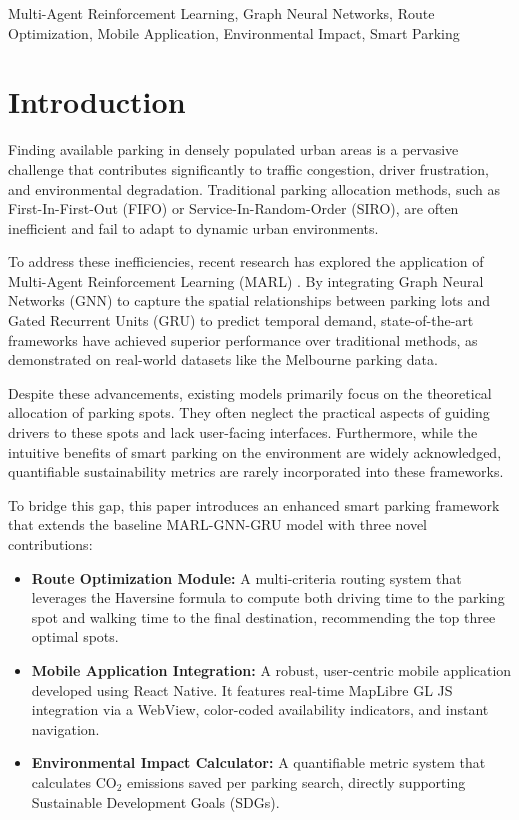 \documentclass[conference]{IEEEtran}
\begin{document}
\begin{IEEEkeywords}
Multi-Agent Reinforcement Learning, Graph Neural Networks, Route Optimization, Mobile Application, Environmental Impact, Smart Parking
\end{IEEEkeywords}

\section{Introduction}
Finding available parking in densely populated urban areas is a pervasive challenge that contributes significantly to traffic congestion, driver frustration, and environmental degradation. Traditional parking allocation methods, such as First-In-First-Out (FIFO) or Service-In-Random-Order (SIRO), are often inefficient and fail to adapt to dynamic urban environments. 

To address these inefficiencies, recent research has explored the application of Multi-Agent Reinforcement Learning (MARL) \cite{base_paper}. By integrating Graph Neural Networks (GNN) to capture the spatial relationships between parking lots and Gated Recurrent Units (GRU) to predict temporal demand, state-of-the-art frameworks have achieved superior performance over traditional methods, as demonstrated on real-world datasets like the Melbourne parking data. 

Despite these advancements, existing models primarily focus on the theoretical allocation of parking spots. They often neglect the practical aspects of guiding drivers to these spots and lack user-facing interfaces. Furthermore, while the intuitive benefits of smart parking on the environment are widely acknowledged, quantifiable sustainability metrics are rarely incorporated into these frameworks.

To bridge this gap, this paper introduces an enhanced smart parking framework that extends the baseline MARL-GNN-GRU model with three novel contributions:
\begin{itemize}
    \item \textbf{Route Optimization Module:} A multi-criteria routing system that leverages the Haversine formula to compute both driving time to the parking spot and walking time to the final destination, recommending the top three optimal spots.
    \item \textbf{Mobile Application Integration:} A robust, user-centric mobile application developed using React Native. It features real-time MapLibre GL JS integration via a WebView, color-coded availability indicators, and instant navigation.
    \item \textbf{Environmental Impact Calculator:} A quantifiable metric system that calculates CO$_2$ emissions saved per parking search, directly supporting Sustainable Development Goals (SDGs).
\end{itemize}
\end{document}
